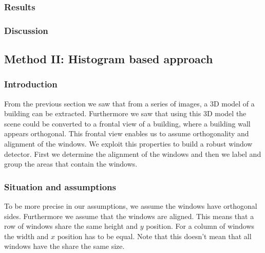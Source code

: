 \subsubsection{Results} %


\newpage
{}

\subsubsection{Discussion}

\subsection{Method II: Histogram based approach} 
\subsubsection{Introduction}
From the previous section we saw that from a series of images, a 3D model of a
building can be extracted. Furthermore we saw that using this 3D model the
scene could be converted to a frontal view of a building, where a building wall
appears orthogonal.  This frontal view enables us to assume orthogonality and
alignment of the windows. 
We exploit this properties to build a robust window detector. First we determine
the alignment of the windows and then we label and group the areas that
contain the windows. 

\subsubsection{Situation and assumptions}
To be more precise in our assumptions, we assume the windows have orthogonal
sides.  Furthermore we assume that the windows are aligned. This means that a
row of windows share the same height and $y$ position. For a column of windows
the width and $x$ position has to be equal.  Note that this doesn't mean that
all windows have the share the same size.

